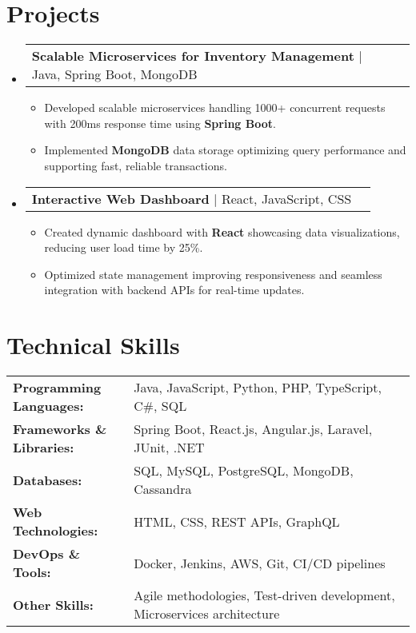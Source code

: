 \documentclass[letterpaper,11pt]{article}
\makeatletter
\newcommand{\resumeItem}[1]{
  \item\footnotesize{
    {#1 \vspace{-2pt}}
  }
}
\newcommand{\resumeProjectHeading}[2]{
    \item
    \begin{tabular*}{1.001\textwidth}{l@{\extracolsep{\fill}}r}
      \small#1 & \textbf{\small #2}\\
    \end{tabular*}\vspace{-7pt}
}
\newcommand{\resumeSubHeadingListStart}{\begin{itemize}[leftmargin=0pt, label={}]}
\newcommand{\resumeSubHeadingListEnd}{\end{itemize}}
\newcommand{\resumeItemListStart}{\begin{itemize}[leftmargin=*]}
\newcommand{\resumeItemListEnd}{\end{itemize}\vspace{-5pt}}
\makeatother
\begin{document}
\section{Projects}
    \vspace{-5pt}
    \resumeSubHeadingListStart
      \resumeProjectHeading
          {\textbf{Scalable Microservices for Inventory Management} | Java, Spring Boot, MongoDB}
          {}
          \resumeItemListStart
              \resumeItem{Developed scalable microservices handling 1000+ concurrent requests with 200ms response time using \textbf{Spring Boot}.}
              \resumeItem{Implemented \textbf{MongoDB} data storage optimizing query performance and supporting fast, reliable transactions.}
          \resumeItemListEnd
          \vspace{-16pt}
      \resumeProjectHeading
          {\textbf{Interactive Web Dashboard} | React, JavaScript, CSS}
          {}
          \resumeItemListStart
              \resumeItem{Created dynamic dashboard with \textbf{React} showcasing data visualizations, reducing user load time by 25\%.}
              \resumeItem{Optimized state management improving responsiveness and seamless integration with backend APIs for real-time updates.}
          \resumeItemListEnd
    \resumeSubHeadingListEnd
\vspace{-10pt}
\section{Technical Skills}
        \vspace{-14pt}
        \begin{table}[h]
            \footnotesize
            \begin{tabular}{p{0.3\linewidth} p{0.7\linewidth}}
                \textbf{Programming Languages:} & Java, JavaScript, Python, PHP, TypeScript, C\#, SQL \\
                \textbf{Frameworks \& Libraries:} & Spring Boot, React.js, Angular.js, Laravel, JUnit, .NET \\
                \textbf{Databases:} & SQL, MySQL, PostgreSQL, MongoDB, Cassandra \\
                \textbf{Web Technologies:} & HTML, CSS, REST APIs, GraphQL \\
                \textbf{DevOps \& Tools:} & Docker, Jenkins, AWS, Git, CI/CD pipelines \\
                \textbf{Other Skills:} & Agile methodologies, Test-driven development, Microservices architecture \\
            \end{tabular}
        \end{table}
\end{document}
